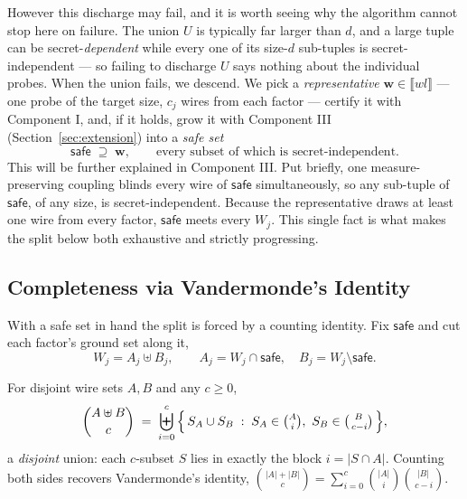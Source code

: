   However this discharge may fail, and it is worth seeing why the algorithm cannot stop here on
  failure. The union $U$ is typically far larger than $d$, and a large tuple can
  be secret-\emph{dependent} while every one of its size-$d$ sub-tuples is
  secret-independent --- so failing to discharge $U$ says nothing about the
  individual probes. When the union fails, we descend. We pick a
  \emph{representative} $\mathbf{w} \in \llbracket wl \rrbracket$ --- one probe of
  the target size, $c_j$ wires from each factor --- certify it with Component I,
  and, if it holds, grow it with Component III (Section~\ref{sec:extension}) into a
  \emph{safe set}
  \[
    \mathsf{safe} \;\supseteq\; \mathbf{w}, \qquad
    \text{every subset of which is secret-independent.}
  \]
  This will be further explained in Component III. Put briefly,
  one measure-preserving coupling
  blinds every wire of $\mathsf{safe}$ simultaneously, so any sub-tuple of
  $\mathsf{safe}$, of any size, is secret-independent. Because the
  representative draws at least one wire from every factor, $\mathsf{safe}$ meets
  every $W_j$. This single fact is what makes the split below both exhaustive and
  strictly progressing.

  \subsection{Completeness via Vandermonde's Identity}
  \label{sec:vandermonde}

  With a safe set in hand the split is forced by a counting identity. Fix
  $\mathsf{safe}$ and cut each factor's ground set along it,
  \[
    W_j = A_j \uplus B_j, \qquad A_j = W_j \cap \mathsf{safe}, \quad B_j = W_j \setminus \mathsf{safe}.
  \]

  \begin{lemma}
  \label{lem:set-vandermonde}
  For disjoint wire sets $A, B$ and any $c \ge 0$,
  \[
    \binom{A \uplus B}{c} \;=\; \biguplus_{i=0}^{c}
      \Big\{\, S_A \cup S_B \;:\; S_A \in \tbinom{A}{i},\ S_B \in \tbinom{B}{\,c-i} \,\Big\},
  \]
  a \emph{disjoint} union: each $c$-subset $S$ lies in exactly the block
  $i = |S \cap A|$. Counting both sides recovers Vandermonde's identity,
  $\binom{|A|+|B|}{c} = \sum_{i=0}^{c} \binom{|A|}{i} \binom{|B|}{\,c-i}$.
  \end{lemma}

